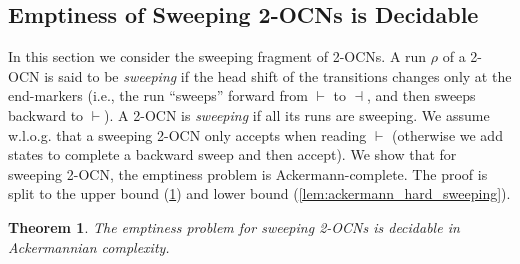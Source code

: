 \documentclass[11pt,a4paper]{amsart}
\newtheorem{theorem}{Theorem}
\theoremstyle{definition}
\newcommand{\shtodo}[1]{\todo[color=cyan!25,size=\small]{SH: #1}}
\newcommand{\lmark}{\vdash}
\newcommand{\rmark}{\dashv}
\begin{document}
\subsection{Emptiness of Sweeping 2-OCNs is Decidable}
\label{sec:sweeping} In this section we consider the sweeping fragment of
2-OCNs. A run $\rho$ of a 2-OCN is said to be \emph{sweeping} if the head shift
of the transitions changes only at the end-markers (i.e., the run ``sweeps''
forward from $\lmark$ to $\rmark$, and then sweeps backward to $\lmark$). A
2-OCN is \emph{sweeping} if all its runs are sweeping.  We assume w.l.o.g. that
a sweeping 2-OCN only accepts when reading $\lmark$ (otherwise we add states to
complete a backward sweep and then accept).
We show that for sweeping 2-OCN, the emptiness problem is Ackermann-complete. The proof is split to the upper bound (\cref{thm:Emptiness_Sweeping_decidable_ackermann}) and lower bound (\cref{lem:ackermann_hard_sweeping}).
\begin{theorem}
	\label{thm:Emptiness_Sweeping_decidable_ackermann} The emptiness problem for
	sweeping 2-OCNs is decidable in Ackermannian complexity.
\end{theorem} 
\end{document}
